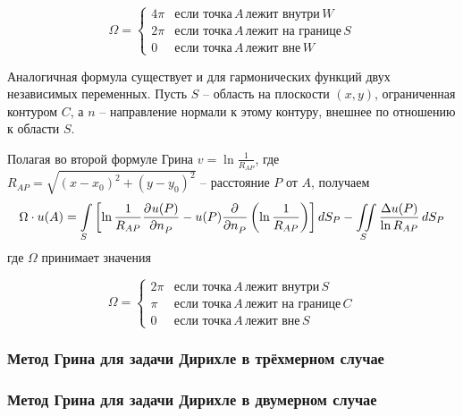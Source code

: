 \[
	\Omega = \begin{cases}
		4 \pi &\mbox{если точка}\, A\, \mbox{лежит внутри}\, W\\
		2 \pi &\mbox{если точка}\, A\, \mbox{лежит на границе}\, S\\
		0 & \mbox{если точка}\, A\, \mbox{лежит вне}\, W
	\end{cases}
\]


Аналогичная формула существует и для гармонических функций двух независимых переменных. 
Пусть $S$ -- область на плоскости $(x, y)$, ограниченная контуром $C$, а $n$ -- направление нормали к этому контуру, внешнее по отношению к области $S$.

Полагая во второй формуле Грина $v = \ln \frac{1}{R_{AP}}$, где $R_{AP} = \sqrt{ (x - x_0)^2 + (y - y_0)^2}$ -- расстояние $P$ от $A$, получаем 
\begin{equation}
	\Omega \cdot u(A) = \int\limits_S \left[ \ln \frac{1}{R_{AP}} \frac{\partial^{}u(P)}{\partial n_P^{}}  - u (P) \frac{\partial^{}}{\partial n_P^{}} \left( \ln \frac{1}{R_{AP}} \right) \right] dS_P - \iint\limits_S \frac{\Delta u (P)}{\ln R_{AP}}\, dS_P
	\label{equ:equMainGreen2d}
\end{equation}
где $\Omega$ принимает значения 

\[
	\Omega = \begin{cases}
		2 \pi &\mbox{если точка}\, A\, \mbox{лежит внутри}\, S\\
		\pi &\mbox{если точка}\, A\, \mbox{лежит на границе}\, C\\
		0 & \mbox{если точка}\, A\, \mbox{лежит вне}\, S
	\end{cases}
\]


\subsubsection{Метод Грина для задачи Дирихле в трёхмерном случае}\label{que:25}
	

\subsubsection{Метод Грина для задачи Дирихле в двумерном случае}\label{que:26}
	


